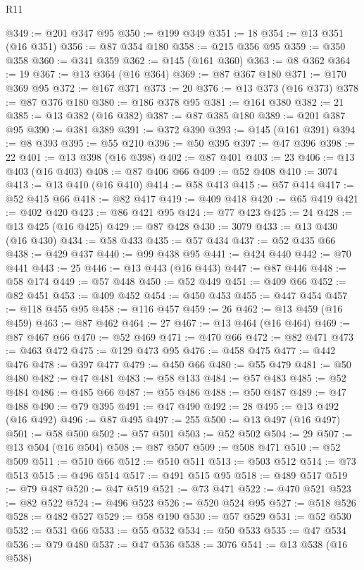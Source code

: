 \begin{lexlean}{R11}
\begin{coremodule}
@349 := @201 @347 @95
@350 := @199 @349
@351 := 18
@354 := @13 @351 (@16 @351)
@356 := @87 @354 @180
@358 := @215 @356 @95
@359 := @350 @358
@360 := @341 @359
@362 := @145 (@161 @360)
@363 := @8 @362
@364 := 19
@367 := @13 @364 (@16 @364)
@369 := @87 @367 @180
@371 := @170 @369 @95
@372 := @167 @371
@373 := 20
@376 := @13 @373 (@16 @373)
@378 := @87 @376 @180
@380 := @186 @378 @95
@381 := @164 @380
@382 := 21
@385 := @13 @382 (@16 @382)
@387 := @87 @385 @180
@389 := @201 @387 @95
@390 := @381 @389
@391 := @372 @390
@393 := @145 (@161 @391)
@394 := @8 @393
@395 := @55 @210
@396 := @50 @395
@397 := @47 @396
@398 := 22
@401 := @13 @398 (@16 @398)
@402 := @87 @401
@403 := 23
@406 := @13 @403 (@16 @403)
@408 := @87 @406 @66
@409 := @52 @408
@410 := 3074
@413 := @13 @410 (@16 @410)
@414 := @58 @413
@415 := @57 @414
@417 := @52 @415 @66
@418 := @82 @417
@419 := @409 @418
@420 := @65 @419
@421 := @402 @420
@423 := @86 @421 @95
@424 := @77 @423
@425 := 24
@428 := @13 @425 (@16 @425)
@429 := @87 @428
@430 := 3079
@433 := @13 @430 (@16 @430)
@434 := @58 @433
@435 := @57 @434
@437 := @52 @435 @66
@438 := @429 @437
@440 := @99 @438 @95
@441 := @424 @440
@442 := @70 @441
@443 := 25
@446 := @13 @443 (@16 @443)
@447 := @87 @446
@448 := @58 @174
@449 := @57 @448
@450 := @52 @449
@451 := @409 @66
@452 := @82 @451
@453 := @409 @452
@454 := @450 @453
@455 := @447 @454
@457 := @118 @455 @95
@458 := @116 @457
@459 := 26
@462 := @13 @459 (@16 @459)
@463 := @87 @462
@464 := 27
@467 := @13 @464 (@16 @464)
@469 := @87 @467 @66
@470 := @52 @469
@471 := @470 @66
@472 := @82 @471
@473 := @463 @472
@475 := @129 @473 @95
@476 := @458 @475
@477 := @442 @476
@478 := @397 @477
@479 := @450 @66
@480 := @55 @479
@481 := @50 @480
@482 := @47 @481
@483 := @58 @133
@484 := @57 @483
@485 := @52 @484
@486 := @485 @66
@487 := @55 @486
@488 := @50 @487
@489 := @47 @488
@490 := @79 @395
@491 := @47 @490
@492 := 28
@495 := @13 @492 (@16 @492)
@496 := @87 @495
@497 := 255
@500 := @13 @497 (@16 @497)
@501 := @58 @500
@502 := @57 @501
@503 := @52 @502
@504 := 29
@507 := @13 @504 (@16 @504)
@508 := @87 @507
@509 := @508 @471
@510 := @52 @509
@511 := @510 @66
@512 := @510 @511
@513 := @503 @512
@514 := @73 @513
@515 := @496 @514
@517 := @491 @515 @95
@518 := @489 @517
@519 := @79 @487
@520 := @47 @519
@521 := @73 @471
@522 := @470 @521
@523 := @82 @522
@524 := @496 @523
@526 := @520 @524 @95
@527 := @518 @526
@528 := @482 @527
@529 := @58 @190
@530 := @57 @529
@531 := @52 @530
@532 := @531 @66
@533 := @55 @532
@534 := @50 @533
@535 := @47 @534
@536 := @79 @480
@537 := @47 @536
@538 := 3076
@541 := @13 @538 (@16 @538)

\end{coremodule}
\end{lexlean}
